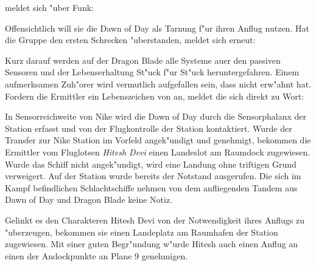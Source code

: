 \xl{} meldet sich "uber Funk:


Offensichtlich will sie die Dawn of Day als Tarnung f"ur ihren Anflug nutzen. Hat die Gruppe den ersten Schrecken "uberstanden, meldet sich \xl{} erneut:


Kurz darauf werden auf der Dragon Blade alle Systeme au\3er den passiven Sensoren und der Lebenserhaltung St"uck f"ur St"uck heruntergefahren. Einem aufmerksamen Zuh"orer wird vermutlich aufgefallen sein, dass \xl{} \ml{} nicht erw"ahnt hat. Fordern die Ermittler ein Lebenszeichen von \ml{} an, meldet die sich direkt zu Wort:


%
%

In Sensorreichweite von Nike wird die Dawn of Day durch die Sensorphalanx der Station erfasst und von der Flugkontrolle der Station kontaktiert. Wurde der Transfer zur Nike Station im Vorfeld angek"undigt und genehmigt, bekommen die Ermittler vom Fluglotsen \emph{Hitesh Devi} einen Landeslot am Raumdock zugewiesen. Wurde das Schiff nicht angek"undigt, wird eine Landung ohne triftigen Grund verweigert. Auf der Station wurde bereits der Notstand ausgerufen. Die sich im Kampf befindlichen Schlachtschiffe nehmen von dem anfliegenden Tandem aus Dawn of Day und Dragon Blade keine Notiz.

Gelinkt es den Charakteren Hitesh Devi von der Notwendigkeit ihres Anflugs zu "uberzeugen, bekommen sie einen Landeplatz am Raumhafen der Station zugewiesen. Mit einer guten Begr"undung w"urde Hitesh auch einen Anflug an einen der Andockpunkte an Plane 9 genehmigen.

